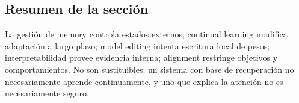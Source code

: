 \subsection{Resumen de la sección}

La gestión de memory controla estados externos; continual learning modifica adaptación a largo plazo; model editing intenta escritura local de pesos; interpretabilidad provee evidencia interna; alignment restringe objetivos y comportamientos. No son sustituibles: un sistema con base de recuperación no necesariamente aprende continuamente, y uno que explica la atención no es necesariamente seguro.

